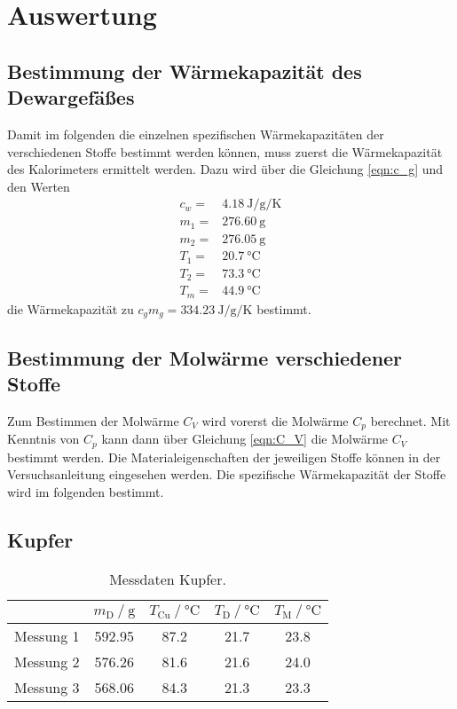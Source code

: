 \section{Auswertung}
\label{sec:Auswertung}


\subsection{Bestimmung der Wärmekapazität des Dewargefäßes}

Damit im folgenden die einzelnen spezifischen Wärmekapazitäten der verschiedenen Stoffe bestimmt werden können, muss zuerst die Wärmekapazität des Kalorimeters ermittelt werden. Dazu wird über die Gleichung \eqref{eqn:c_g} und den Werten
\begin{align*}
    c_w= & \SI{4.18}{\joule\per\g\per\kelvin} \\
    m_1= & \SI{276.60}{\g}         \\
    m_2= & \SI{276.05}{\g}         \\
    T_1= & \SI{20.7}{\celsius}    \\
    T_2= & \SI{73.3}{\celsius}    \\
    T_m= & \SI{44.9}{\celsius}  
\end{align*}
die Wärmekapazität zu $c_gm_g=\SI{334.23}{\joule\per\g\per\kelvin}$ bestimmt.

\subsection{Bestimmung der Molwärme verschiedener Stoffe}
 
Zum Bestimmen der Molwärme $C_V$ wird vorerst die Molwärme $C_p$ berechnet. Mit Kenntnis von $C_p$ kann dann über Gleichung \eqref{eqn:C_V} die Molwärme $C_V$ bestimmt werden. Die Materialeigenschaften der jeweiligen Stoffe können in der Versuchsanleitung \cite{V201} eingesehen werden. 
Die spezifische Wärmekapazität der Stoffe wird im folgenden bestimmt.

\subsection{Kupfer}

\begin{table}
    \centering
    \caption{Messdaten Kupfer.}
    \label{tab:k}
    \begin{tabular}{c| S S S S }
        \toprule
        & $m_\text{D} \:/\: \si{\g}$ & $T_\text{Cu} \:/\: \si{\celsius}$ & $T_\text{D} \:/\: \si{\celsius}$ &  $T_\text{M}\:/\: \si{\celsius}$  \\
        \midrule
        Messung 1 & 592.95 & 87.2 & 21.7 & 23.8 \\
        Messung 2 & 576.26 & 81.6 & 21.6 & 24.0 \\
        Messung 3 & 568.06 & 84.3 & 21.3 & 23.3 \\
        \bottomrule 
    \end{tabular}
\end{table}

